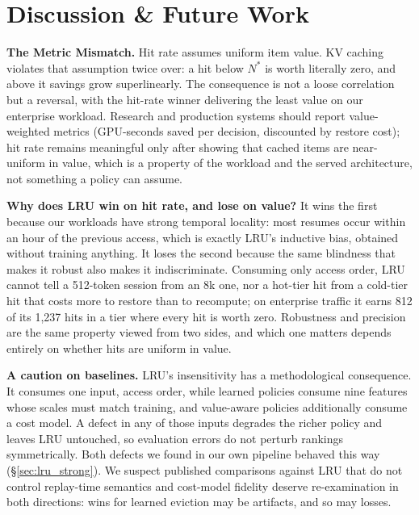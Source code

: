 \documentclass[letterpaper,twocolumn,10pt]{article}
\begin{document}
\section{Discussion \& Future Work}

\textbf{The Metric Mismatch.} Hit rate assumes uniform item value. KV caching violates that assumption twice over: a hit below $N^{*}$ is worth literally zero, and above it savings grow superlinearly. The consequence is not a loose correlation but a reversal, with the hit-rate winner delivering the least value on our enterprise workload. Research and production systems should report value-weighted metrics (GPU-seconds saved per decision, discounted by restore cost); hit rate remains meaningful only after showing that cached items are near-uniform in value, which is a property of the workload and the served architecture, not something a policy can assume.

\textbf{Why does LRU win on hit rate, and lose on value?} It wins the first because our workloads have strong temporal locality: most resumes occur within an hour of the previous access, which is exactly LRU's inductive bias, obtained without training anything. It loses the second because the same blindness that makes it robust also makes it indiscriminate. Consuming only access order, LRU cannot tell a 512-token session from an 8k one, nor a hot-tier hit from a cold-tier hit that costs more to restore than to recompute; on enterprise traffic it earns 812 of its 1,237 hits in a tier where every hit is worth zero. Robustness and precision are the same property viewed from two sides, and which one matters depends entirely on whether hits are uniform in value.

\textbf{A caution on baselines.} LRU's insensitivity has a methodological consequence. It consumes one input, access order, while learned policies consume nine features whose scales must match training, and value-aware policies additionally consume a cost model. A defect in any of those inputs degrades the richer policy and leaves LRU untouched, so evaluation errors do not perturb rankings symmetrically. Both defects we found in our own pipeline behaved this way (\S\ref{sec:lru_strong}). We suspect published comparisons against LRU that do not control replay-time semantics and cost-model fidelity deserve re-examination in both directions: wins for learned eviction may be artifacts, and so may losses.
\end{document}
